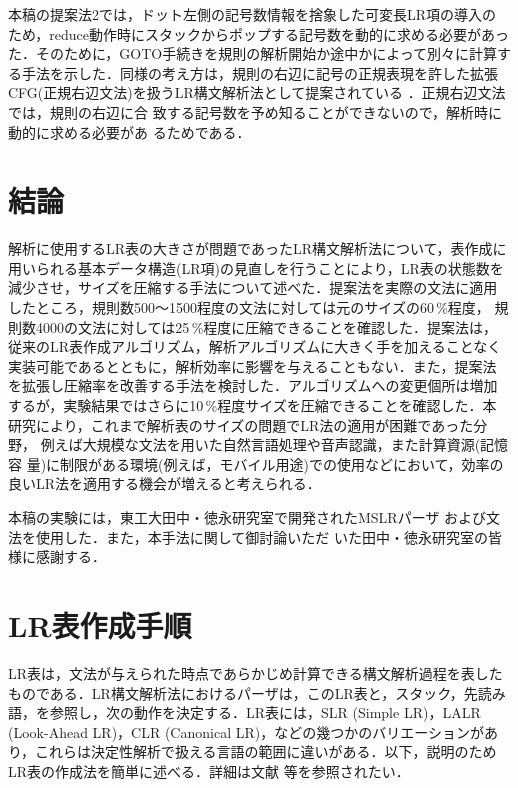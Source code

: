 本稿の提案法2では，ドット左側の記号数情報を捨象した可変長LR項の導入の
ため，reduce動作時にスタックからポップする記号数を動的に求める必要があっ
た．そのために，GOTO手続きを規則の解析開始か途中かによって別々に計算す
る手法を示した．同様の考え方は，規則の右辺に記号の正規表現を許した拡張
CFG(正規右辺文法)を扱うLR構文解析法として提案されている
\cite{nederhof1994,purdom1981}．正規右辺文法では，規則の右辺に合
致する記号数を予め知ることができないので，解析時に動的に求める必要があ
るためである．


\section{結論}

解析に使用するLR表の大きさが問題であったLR構文解析法について，表作成に
用いられる基本データ構造(LR項)の見直しを行うことにより，LR表の状態数を
減少させ，サイズを圧縮する手法について述べた．提案法を実際の文法に適用
したところ，規則数500〜1500程度の文法に対しては元のサイズの60\,\%程度，
規則数4000の文法に対しては25\,\%程度に圧縮できることを確認した．提案法は，
従来のLR表作成アルゴリズム，解析アルゴリズムに大きく手を加えることなく
実装可能であるとともに，解析効率に影響を与えることもない．また，提案法
を拡張し圧縮率を改善する手法を検討した．アルゴリズムへの変更個所は増加
するが，実験結果ではさらに10\,\%程度サイズを圧縮できることを確認した．本
研究により，これまで解析表のサイズの問題でLR法の適用が困難であった分野，
例えば大規模な文法を用いた自然言語処理や音声認識，また計算資源(記憶容
量)に制限がある環境(例えば，モバイル用途)での使用などにおいて，効率の
良いLR法を適用する機会が増えると考えられる．

\acknowledgment

本稿の実験には，東工大田中・徳永研究室で開発されたMSLRパーザ
\cite{mslr1998}および文法を使用した．また，本手法に関して御討論いただ
いた田中・徳永研究室の皆様に感謝する．







\appendix
\section{LR表作成手順}


LR表は，文法が与えられた時点であらかじめ計算できる構文解析過程を表した
ものである．LR構文解析法におけるパーザは，このLR表と，スタック，先読み
語，を参照し，次の動作を決定する．LR表には，SLR (Simple LR)，LALR
(Look-Ahead LR)，CLR (Canonical LR)，などの幾つかのバリエーションがあ
り，これらは決定性解析で扱える言語の範囲に違いがある．以下，説明のため
LR表の作成法を簡単に述べる．詳細は文献
\cite{aho1986,tanaka1989}等を参照されたい．

